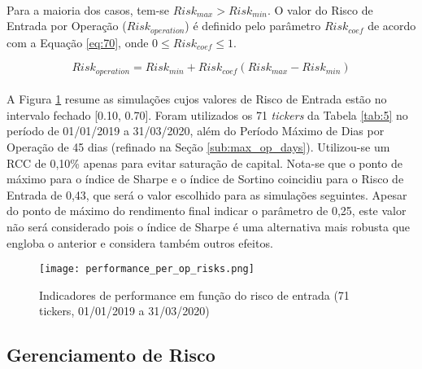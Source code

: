 \paragraph{} Para a maioria dos casos, tem-se \begin{math} Risk_{max} > Risk_{min} \end{math}. O valor do Risco de Entrada por Operação (\begin{math} Risk_{operation} \end{math}) é definido pelo parâmetro \begin{math} Risk_{coef} \end{math} de acordo com a Equação \ref{eq:70}, onde \begin{math} 0 \le Risk_{coef} \le 1 \end{math}.

\begin{equation} \label{eq:70}
    Risk_{operation} = Risk_{min} + Risk_{coef}(Risk_{max} - Risk_{min})
\end{equation}

\paragraph{} A Figura \ref{fig:553} resume as simulações cujos valores de Risco de Entrada estão no intervalo fechado [0.10, 0.70]. Foram utilizados os 71 \textit{tickers} da Tabela \ref{tab:5} no período de 01/01/2019 a 31/03/2020, além do Período Máximo de Dias por Operação de 45 dias (refinado na Seção \ref{sub:max_op_days}). Utilizou-se um RCC de 0,10\% apenas para evitar saturação de capital. Nota-se que o ponto de máximo para o índice de Sharpe e o índice de Sortino coincidiu para o Risco de Entrada de 0,43, que será o valor escolhido para as simulações seguintes. Apesar do ponto de máximo do rendimento final indicar o parâmetro de 0,25, este valor não será considerado pois o índice de Sharpe é uma alternativa mais robusta que engloba o anterior e considera também outros efeitos.

\begin{figure}[!htb]
    \texttt{[image: performance\_per\_op\_risks.png]}
    \centering
    \caption{Indicadores de performance em função do risco de entrada (71 tickers, 01/01/2019 a 31/03/2020)}
    \label{fig:553}
\end{figure}



\FloatBarrier
\subsection{Gerenciamento de Risco}
\label{sub:risk_man}

